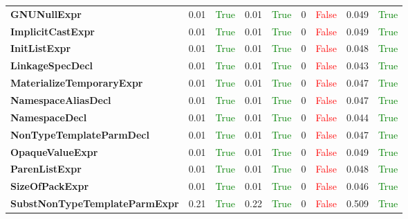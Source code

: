 \documentclass{article}
\begin{document}
\begin{xltabular}{\textwidth}{lcccccccc}
\textbf{{\fontsize{10}{12}\selectfont GNUNullExpr}}& 0.01&\textcolor{green}{True}& 0.01&\textcolor{green}{True}& 0&\textcolor{red}{False}& 0.049&\textcolor{green}{True} \\[0.5ex]
\textbf{{\fontsize{10}{12}\selectfont ImplicitCastExpr}}& 0.01&\textcolor{green}{True}& 0.01&\textcolor{green}{True}& 0&\textcolor{red}{False}& 0.049&\textcolor{green}{True} \\[0.5ex]
\textbf{{\fontsize{10}{12}\selectfont InitListExpr}}& 0.01&\textcolor{green}{True}& 0.01&\textcolor{green}{True}& 0&\textcolor{red}{False}& 0.048&\textcolor{green}{True} \\[0.5ex]
\textbf{{\fontsize{10}{12}\selectfont LinkageSpecDecl}}& 0.01&\textcolor{green}{True}& 0.01&\textcolor{green}{True}& 0&\textcolor{red}{False}& 0.043&\textcolor{green}{True} \\[0.5ex]
\textbf{{\fontsize{10}{12}\selectfont MaterializeTemporaryExpr}}& 0.01&\textcolor{green}{True}& 0.01&\textcolor{green}{True}& 0&\textcolor{red}{False}& 0.047&\textcolor{green}{True} \\[0.5ex]
\textbf{{\fontsize{10}{12}\selectfont NamespaceAliasDecl}}& 0.01&\textcolor{green}{True}& 0.01&\textcolor{green}{True}& 0&\textcolor{red}{False}& 0.047&\textcolor{green}{True} \\[0.5ex]
\textbf{{\fontsize{10}{12}\selectfont NamespaceDecl}}& 0.01&\textcolor{green}{True}& 0.01&\textcolor{green}{True}& 0&\textcolor{red}{False}& 0.044&\textcolor{green}{True} \\[0.5ex]
\textbf{{\fontsize{10}{12}\selectfont NonTypeTemplateParmDecl}}& 0.01&\textcolor{green}{True}& 0.01&\textcolor{green}{True}& 0&\textcolor{red}{False}& 0.047&\textcolor{green}{True} \\[0.5ex]
\textbf{{\fontsize{10}{12}\selectfont OpaqueValueExpr}}& 0.01&\textcolor{green}{True}& 0.01&\textcolor{green}{True}& 0&\textcolor{red}{False}& 0.049&\textcolor{green}{True} \\[0.5ex]
\textbf{{\fontsize{10}{12}\selectfont ParenListExpr}}& 0.01&\textcolor{green}{True}& 0.01&\textcolor{green}{True}& 0&\textcolor{red}{False}& 0.048&\textcolor{green}{True} \\[0.5ex]
\textbf{{\fontsize{10}{12}\selectfont SizeOfPackExpr}}& 0.01&\textcolor{green}{True}& 0.01&\textcolor{green}{True}& 0&\textcolor{red}{False}& 0.046&\textcolor{green}{True} \\[0.5ex]
\textbf{{\fontsize{10}{12}\selectfont SubstNonTypeTemplateParmExpr}}& 0.21&\textcolor{green}{True}& 0.22&\textcolor{green}{True}& 0&\textcolor{red}{False}& 0.509&\textcolor{green}{True} \\[0.5ex]

\end{xltabular}
\end{document}
